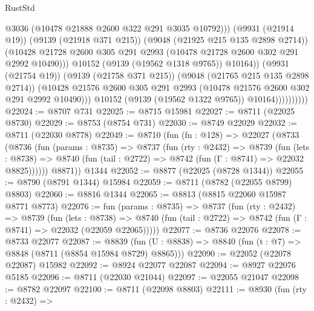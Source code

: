 \begin{lexlean}{RustStd}
\begin{coremodule}
                                    @3036
                                    (@10478 @21888 @2600 @322 @291 @3035 @10792)))
                                (@9931 (@21914 @19))
                                (@9139 (@21918 @371 @215))
                                (@9048 (@21925 @215 @135 @2898 @2714))
                                (@10428
                                  @21728
                                  @2600
                                  @305
                                  @291
                                  @2993
                                  (@10478 @21728 @2600 @302 @291 @2992 @10490)))
                              @10152
                              (@9139 (@19562 @1318 @9765))
                              @10164))
                          (@9931 (@21754 @19))
                          (@9139 (@21758 @371 @215))
                          (@9048 (@21765 @215 @135 @2898 @2714))
                          (@10428
                            @21576
                            @2600
                            @305
                            @291
                            @2993
                            (@10478 @21576 @2600 @302 @291 @2992 @10490)))
                        @10152
                        (@9139 (@19562 @1322 @9765))
                        @10164))))))))))
@22024 := @8707 @731
@22025 := @8715 @15981
@22027 := @8711 (@22025 @8730)
@22029 := @8753 (@8754 @731)
@22030 := @8749 @22029
@22032 := @8711 (@22030 @8778)
@22049 := @8710
    (fun (fn : @128) =>
    @22027
      (@8733
        (@8736
          (fun (params : @8735) =>
          @8737
            (fun (rty : @2432) =>
            @8739
              (fun (lets : @8738) =>
              @8740 (fun (tail : @2722) => @8742 (fun (Γ : @8741) => @22032 @8825))))))
        @8871))
    @1344
@22052 := @8877 (@22025 (@8728 @1344))
@22055 := @8790 (@8791 @1344) @15984
@22059 := @8711 (@8782 (@22055 @8799) @8803)
@22060 := @8816 @1344
@22065 := @8813 (@8815 @22060 @15987 @8771 @8773)
@22076 := fun (params : @8735) =>
  @8737
    (fun (rty : @2432) =>
    @8739
      (fun (lets : @8738) =>
      @8740 (fun (tail : @2722) => @8742 (fun (Γ : @8741) => @22032 (@22059 @22065)))))
@22077 := @8736 @22076
@22078 := @8733 @22077
@22087 := @8839
    (fun (U : @8838) => @8840 (fun (t : @7) => @8848 (@8711 (@8854 @15984 @8729) @8865)))
@22090 := @22052 (@22078 @22087) @15982
@22092 := @8924 @22077 @22087
@22094 := @8927 @22076 @5185
@22096 := @8711 (@22030 @21044)
@22097 := @22055 @21047
@22098 := @8782 @22097
@22100 := @8711 (@22098 @8803)
@22111 := @8930
    (fun (rty : @2432) =>

\end{coremodule}
\end{lexlean}
